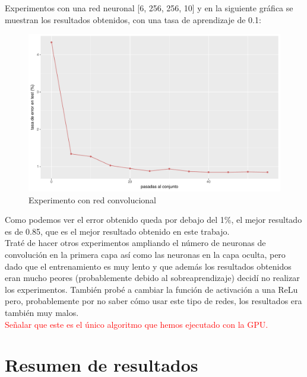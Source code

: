 \documentclass[10pt,a4paper]{article}
\begin{document}
Experimentos con una red neuronal [6, 256, 256, 10] y en la siguiente gráfica se muestran los resultados obtenidos, con una tasa de aprendizaje de 0.1:

\begin{figure}[H]
\includegraphics[scale=0.6]{img/convolution.pdf}
\caption{Experimento con red convolucional}
\end{figure}

Como podemos ver el error obtenido queda por debajo del 1\%, el mejor resultado es de 0.85, que es el mejor resultado obtenido en este trabajo.\\

Traté de hacer otros experimentos ampliando el número de neuronas de convolución en la primera capa así como las neuronas en la capa oculta, pero dado que el entrenamiento es muy lento y que además los resultados obtenidos eran mucho peores (probablemente debido al sobreaprendizaje) decidí no realizar los experimentos. También probé a cambiar la función de activación a una ReLu pero, probablemente por no saber cómo usar este tipo de redes, los resultados era también muy malos.\\

\textcolor{red}{Señalar que este es el único algoritmo que hemos ejecutado con la GPU.}

\section{Resumen de resultados}
\end{document}
